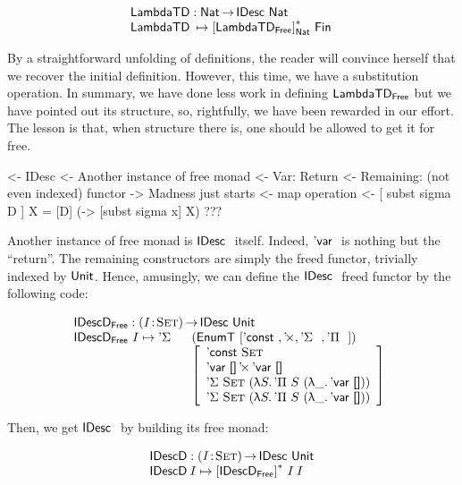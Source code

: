 \[\stk{
\LambdaTD : \Nat \To \IDesc{\Nat} \\
\LambdaTD\: \mapsto \FreeIMonad{[\LambdaTFreeD]}{\Nat}{\Fin{}}
}\]

By a straightforward unfolding of definitions, the reader will
convince herself that we recover the initial definition. However, this
time, we have a substitution operation. In summary, we have done less
work in defining $\LambdaTFreeD$ but we have pointed out its
structure, so, rightfully, we have been rewarded in our effort. The
lesson is that, when structure there is, one should be allowed to get
it for free.

\begin{wstructure}
<- IDesc
    <- Another instance of free monad
        <- Var: Return
        <- Remaining: (not even indexed) functor
    -> Madness just starts
        <- map operation
        <- [ subst sigma D ] X = [D] (\x -> [subst sigma x] X)
        ???
\end{wstructure}

Another instance of free monad is $\IDesc$ itself. Indeed, $\DVar$ is
nothing but the ``return''. The remaining constructors are simply the
freed functor, trivially indexed by $\Unit$. Hence, amusingly, we can
define the $\IDesc$ freed functor by the following code:

\[\stk{
\IDescFreeD : \PI{\V{I}}{\Set} \IDesc{\Unit} \\
\begin{array}{@{}ll}
\IDescFreeD~I \mapsto \DSigma{}{} & (\EnumT [ \DConst{},
                                              \DProd{}{},
                                              \DSigma{}{}, 
                                              \DPi{}{} ]) \\
                                  & \left[\begin{array}{l}
                                        \DConst{\Set}               \\
                                        \DProd{\DVar{\Void}}{\DVar{\Void}}  \\
                                        \DSigma{\Set}{(\LAM{S} \DPi{S}{(\LAM{\_} \DVar{\Void})})} \\
                                        \DSigma{\Set}{(\LAM{S} \DPi{S}{(\LAM{\_} \DVar{\Void})})}
                                    \end{array}\right]
\end{array}
}\]

Then, we get $\IDesc$ by building its free monad:

\[\stk{
\IDescD : \PI{\V{I}}{\Set} \IDesc{\Unit} \\
\IDescD\: I \mapsto \FreeMonad{[\IDescFreeD]}{I}\: I
}\]


